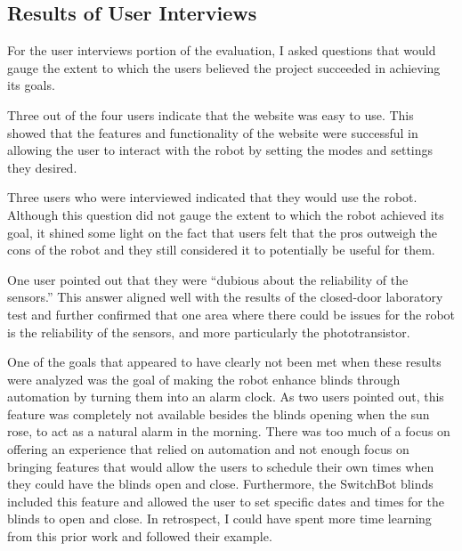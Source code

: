 \documentclass[10pt,twocolumn]{article}
\begin{document}
\subsection{Results of User Interviews}
For the user interviews portion of the evaluation, I asked questions that would gauge the extent to which the users believed the project succeeded in achieving its goals. 

Three out of the four users indicate that the website was easy to use. This showed that the features and functionality of the website were successful in allowing the user to interact with the robot by setting the modes and settings they desired.

Three users who were interviewed indicated that they would use the robot. Although this question did not  gauge the extent to which the robot achieved its goal, it shined some light on the fact that users felt that the pros outweigh the cons of the robot and they still considered it to potentially be useful for them. 

One user pointed out that they were “dubious about the reliability of the sensors.” This answer aligned well with the results of the closed-door laboratory test and further confirmed that one area where there could be issues for the robot is the reliability of the sensors, and more particularly the phototransistor.

One of the goals that appeared to have clearly not been met when these results were analyzed was the goal of making the robot enhance blinds through automation by turning them into an alarm clock. As two users pointed out, this feature was completely not available besides the blinds opening when the sun rose, to act as a natural alarm in the morning. There was too much of a focus on offering an experience that relied on automation and not enough focus on bringing features that would allow the users to schedule their own times when they could have the blinds open and close. Furthermore, the SwitchBot blinds included this feature and allowed the user to set specific dates and times for the blinds to open and close. In retrospect, I could have spent more time learning from this prior work and followed their example.
\end{document}
